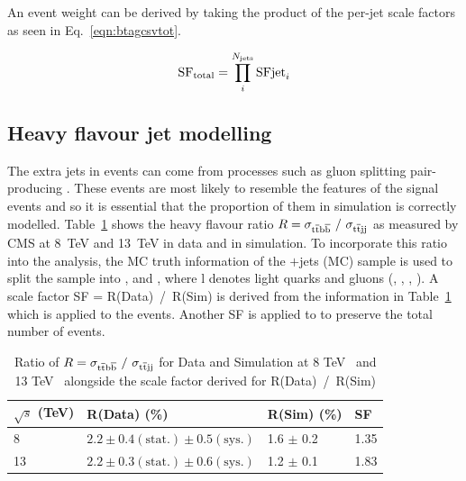 An event weight can be derived by taking the product of the per-jet scale factors as seen in Eq.~\ref{eqn:btagcsvtot}.

\begin{equation}
\textrm{SF}_{\textrm{total}} = \prod_{i}^{N_{\textrm{jets}}}\textrm{SFjet}_{i}
\label{eqn:btagcsvtot}
\end{equation}

\subsection{Heavy flavour jet modelling ~\label{ttbbmod}}
The extra jets in \ttbar events can come from processes such as gluon splitting pair-producing \bbbar. These \ttbb events are most likely to resemble the features of the \tttt signal events and so it is essential that the proportion of them in simulation is correctly modelled. Table~\ref{tab:heavyflavR} shows the heavy flavour ratio $R= \sigma_{\mathrm{t}\overline{\mathrm{t}}\mathrm{b}\overline{\mathrm{b}}}~/~ \sigma_{\mathrm{t}\overline{\mathrm{t}} \textrm{jj} }$ as measured by CMS at 8~TeV and 13~TeV in data and in simulation. To incorporate this ratio into the analysis, the MC truth information of the \ttbar$+$jets (MC) sample is used to split the sample into \ttbb, \ttcc and \ttll, where l denotes light quarks and gluons (\cPqu, \cPqd, \cPqs, \cPg).  A scale factor SF = R(Data)~/~R(Sim) is derived from the information in Table~\ref{tab:heavyflavR} which is applied to the \ttbb events. Another SF is applied to \ttll to preserve the total number of \ttbar events.


\begin{table}[htpb!]
\footnotesize
\begin{center}
\begin{tabular}{|l|l|l|l|}
\hline
$\sqrt{s}$ (TeV)                         & R(Data)  (\%)                                                                             & R(Sim) (\%)       & SF   \\
\hline
8  & $2.2 \pm 0.4 \left( \textrm{stat.} \right) \pm 0.5 \left(\textrm{sys.} \right)$ & 1.6 $\pm$ 0.2 & 1.35 \\
13 & $2.2 \pm 0.3 \left( \textrm{stat.} \right) \pm 0.6 \left(\textrm{sys.} \right)$ & 1.2 $\pm$ 0.1 & 1.83 \\
\hline
\end{tabular}
\caption{Ratio of $R= \sigma_{\mathrm{t}\overline{\mathrm{t}}\mathrm{b}\overline{\mathrm{b}}}~/~ \sigma_{\mathrm{t}\overline{\mathrm{t}} \textrm{jj} }$ for Data and Simulation at 8 TeV~\cite{Khachatryan2015132} and 13 TeV~\cite{CMS-PAS-TOP-16-010} alongside the scale factor derived for R(Data)~/~R(Sim)}
\label{tab:heavyflavR}
\end{center}
\end{table}

